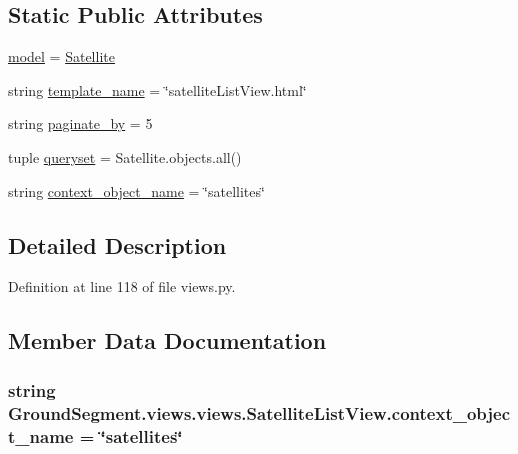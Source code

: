 \subsection*{Static Public Attributes}
\begin{DoxyCompactItemize}
\item 
\hyperlink{class_ground_segment_1_1views_1_1views_1_1_satellite_list_view_accb8a75ec06ce4cadcae8be775497d05}{model} = \hyperlink{class_ground_segment_1_1models_1_1_satellite_1_1_satellite}{Satellite}
\item 
string \hyperlink{class_ground_segment_1_1views_1_1views_1_1_satellite_list_view_a157f3c14fd467b28cca4c569d16d60cd}{template\+\_\+name} = \char`\"{}satellite\+List\+View.\+html\char`\"{}
\item 
string \hyperlink{class_ground_segment_1_1views_1_1views_1_1_satellite_list_view_a91cc07306c9be6d938df33a8939df7a2}{paginate\+\_\+by} = \textquotesingle{}5\textquotesingle{}
\item 
tuple \hyperlink{class_ground_segment_1_1views_1_1views_1_1_satellite_list_view_a1341165d2c9701d75b8f98d455205268}{queryset} = Satellite.\+objects.\+all()
\item 
string \hyperlink{class_ground_segment_1_1views_1_1views_1_1_satellite_list_view_a6ca8da0b21869460fa11d325c2166fb3}{context\+\_\+object\+\_\+name} = \char`\"{}satellites\char`\"{}
\end{DoxyCompactItemize}


\subsection{Detailed Description}


Definition at line 118 of file views.\+py.



\subsection{Member Data Documentation}
\hypertarget{class_ground_segment_1_1views_1_1views_1_1_satellite_list_view_a6ca8da0b21869460fa11d325c2166fb3}{}
\subsubsection[{context\+\_\+object\+\_\+name}]{\setlength{\rightskip}{0pt plus 5cm}string Ground\+Segment.\+views.\+views.\+Satellite\+List\+View.\+context\+\_\+object\+\_\+name = \char`\"{}satellites\char`\"{}\hspace{0.3cm}{\ttfamily [static]}}\label{class_ground_segment_1_1views_1_1views_1_1_satellite_list_view_a6ca8da0b21869460fa11d325c2166fb3}



